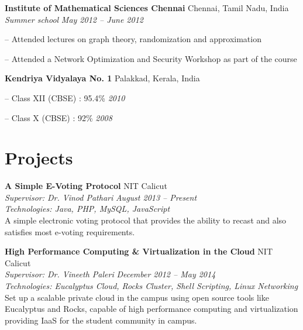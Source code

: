 \documentclass[margin,line]{resume}
\begin{document}
\begin{resume}
    \vspace{2mm}
    
    \textbf{Institute of Mathematical Sciences Chennai} \hfill Chennai, Tamil Nadu, India
    \\
    \textit{Summer school} \hfill \textit{ May 2012 -- June 2012}
    
    \begin{compactitem}
        \item[--] Attended lectures on graph theory, randomization and approximation 
        \item[--] Attended a Network Optimization and Security Workshop as part of the course
    \end{compactitem}
    
    \vspace{2mm}
    
    \textbf{Kendriya Vidyalaya No. 1} \hfill Palakkad, Kerala, India 
    \vspace{+0.5mm}
    \begin{compactitem}
        \item[--] Class XII (CBSE) : 95.4\%    \hfill    \textit{2010}
        \item[--] Class X (CBSE) : 92\%        \hfill    \textit{2008}
    \end{compactitem}

    \section{\mysidestyle Projects}

	
    \textbf{A Simple E-Voting Protocol} 				\hfill NIT Calicut 
    \\
    \textit{Supervisor: Dr. Vinod Pathari } 			\hfill \textit{August 2013 -- Present}
    \\
    \textit{Technologies: Java, PHP, MySQL, JavaScript}
    \\
    A simple electronic voting protocol that provides the ability to recast and also satisfies most e-voting requirements.
    
    \textbf{High Performance Computing \& Virtualization in the Cloud} 				\hfill NIT Calicut
    \\
    \textit{Supervisor: Dr. Vineeth Paleri } 			\hfill \textit{December 2012 -- May 2014}
    \\
    \textit{Technologies: Eucalyptus Cloud, Rocks Cluster, Shell Scripting, Linux Networking}
    \\
    Set up a scalable private cloud in the campus using open source tools like Eucalyptus and Rocks,
capable of high performance computing and virtualization providing IaaS for the student community in campus.
	

\end{resume}
\end{document}
